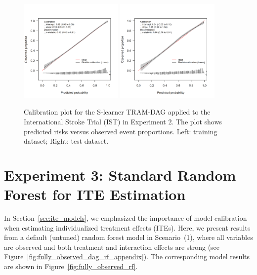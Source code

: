 \begin{figure}[htbp]
\centering
\includegraphics[width=0.45\textwidth]{img/results_IST/IST_TRAM_DAG_slearner_train_calibration_plot.png}
\includegraphics[width=0.45\textwidth]{img/results_IST/IST_TRAM_DAG_slearner_test_calibration_plot.png}
\caption{Calibration plot for the S-learner TRAM-DAG applied to the International Stroke Trial (IST) in Experiment 2. The plot shows predicted risks versus observed event proportions. Left: training dataset; Right: test dataset.}
\label{fig:calibration_IST_TRAM_DAG}
\end{figure}


\clearpage


\section{Experiment 3: Standard Random Forest for ITE Estimation} \label{sec:default_rf_ite}

In Section~\ref{sec:ite_models}, we emphasized the importance of model calibration when estimating individualized treatment effects (ITEs). Here, we present results from a default (untuned) random forest model in Scenario~(1), where all variables are observed and both treatment and interaction effects are strong (see Figure~\ref{fig:fully_observed_dag_rf_appendix}). The corresponding model results are shown in Figure~\ref{fig:fully_observed_rf}.

